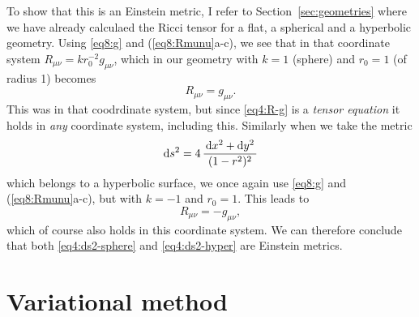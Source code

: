 \documentclass[11pt,a4paper, 
swedish, english %
]{article}
\begin{document}
To show that this is an Einstein metric, I refer to
Section~\ref{sec:geometries} where we have already calculaed the Ricci
tensor for a flat, a spherical and a hyperbolic geometry. Using
\eqref{eq8:g} and (\ref{eq8:Rmunu}a-c), we see that in
that coordinate system $R_{\mu\nu}=kr_0^{-2}g_{\mu\nu}$, which in our
geometry with $k=1$ (sphere) and $r_0=1$ (of radius 1) becomes
\begin{equation}\label{eq4:R-g}
R_{\mu\nu}=g_{\mu\nu}.
\end{equation}
This was in that coodrdinate system, but since \eqref{eq4:R-g} is a
\emph{tensor equation} it holds in \emph{any} coordinate system,
including this. Similarly when we take the metric
\begin{equation}\label{eq4:ds2-hyper}
\mathrm{d}{s}^2=4\,\frac{\,\mathrm{d}{x}^2+\mathrm{d}{y}^2\,}{(1-r^2)^2}
\end{equation}
which belongs to a hyperbolic surface, we once again use \eqref{eq8:g}
and (\ref{eq8:Rmunu}a-c), but with $k=-1$ and $r_0=1$. This leads to
\begin{equation}
R_{\mu\nu}=-g_{\mu\nu},
\end{equation}
which of course also holds in this coordinate system. We can therefore
conclude that both \eqref{eq4:ds2-sphere} and \eqref{eq4:ds2-hyper}
are Einstein metrics.


\section{Variational method}
\end{document}
